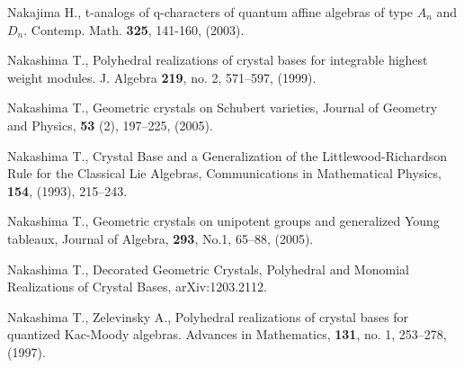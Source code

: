 \begin{thebibliography}{A}
 Nakajima H., t-analogs of q-characters of quantum 
affine algebras of type $A_n$ and $D_n$. Contemp. Math. 
{\bf 325}, 141-160, (2003).

Nakashima T.,
Polyhedral realizations of crystal bases for 
integrable highest weight
modules. J. Algebra {\bf 219}, no. 2, 571--597, (1999). 

 Nakashima T.,
Geometric crystals on Schubert varieties, 
Journal of Geometry and Physics, 
{\bf 53} (2), 197--225, (2005).

 Nakashima T.,
Crystal Base and a Generalization of 
the Littlewood-Richardson Rule for the Classical Lie Algebras, 
Communications in Mathematical Physics, {\bf 154}, (1993), 215--243.

 Nakashima T., 
Geometric crystals on unipotent groups and
generalized Young tableaux, 
Journal of Algebra, {\bf 293}, No.1, 65--88, 
(2005).

 Nakashima T.,
Decorated Geometric Crystals, Polyhedral and Monomial 
Realizations of Crystal Bases, 
arXiv:1203.2112.

Nakashima T., Zelevinsky A., Polyhedral realizations of 
crystal bases for quantized Kac-Moody algebras. 
Advances in Mathematics, {\bf 131}, no. 1, 253--278, (1997). 

\end{thebibliography}



